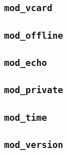 \documentclass[12pt]{article}
\newcommand{\modvcard}{\texttt{mod\_vcard}}
\newcommand{\modoffline}{\texttt{mod\_offline}}
\newcommand{\modecho}{\texttt{mod\_echo}}
\newcommand{\modprivate}{\texttt{mod\_private}}
\newcommand{\modtime}{\texttt{mod\_time}}
\newcommand{\modversion}{\texttt{mod\_version}}
\begin{document}
\subsection{\modvcard{}}
\label{sec:modvcard}



\subsection{\modoffline{}}
\label{sec:modoffline}



\subsection{\modecho{}}
\label{sec:modecho}



\subsection{\modprivate{}}
\label{sec:modprivate}



\subsection{\modtime{}}
\label{sec:modtime}



\subsection{\modversion{}}
\label{sec:modversion}
\end{document}
